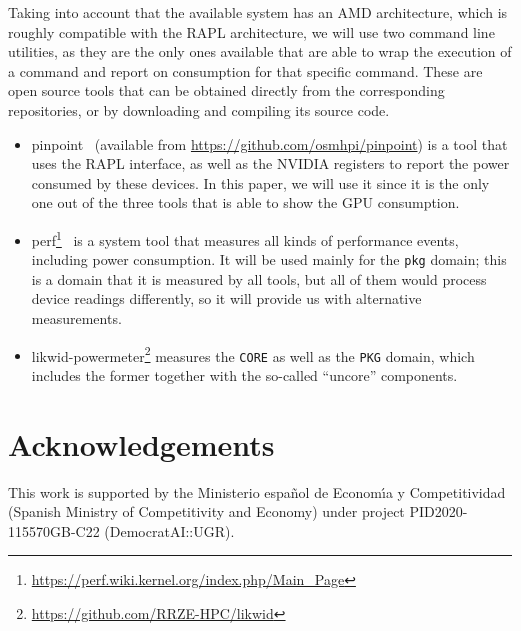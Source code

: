 \documentclass[a4paper,twoside]{article}
\begin{document}
Taking into account that the available system has an AMD architecture, which is
roughly compatible with the RAPL architecture, we will use two command line
utilities, as they are the only ones available that are able to wrap the execution of a command
and report on consumption for that specific command. These are open source tools
that can be obtained directly from the corresponding repositories, or by downloading and
compiling its source code. \begin{itemize}
\item {\sf pinpoint}~\cite{9307947} (available from
  \url{https://github.com/osmhpi/pinpoint}) is a tool that uses the RAPL
  interface, as well as the NVIDIA registers to report the power consumed by
  these devices. In this paper, we will use it since it is the only one out of
  the three tools that is able to show the GPU consumption.
\item {\sf
    perf}\footnote{\url{https://perf.wiki.kernel.org/index.php/Main_Page}}~\cite{treibig2010likwid} is a
  system tool that measures all kinds of performance events, including power
  consumption. It will be used mainly for the  \texttt{pkg} domain; this is a
  domain that it is measured by all tools, but all of them would process device
    readings differently, so it will provide us with alternative measurements. %
\item {\sf likwid-powermeter}\footnote{\url{https://github.com/RRZE-HPC/likwid}}
  measures the \texttt{CORE} as well as the \texttt{PKG} domain, which includes
  the former together with the so-called ``uncore'' components.
  
  \end{itemize}

\section*{Acknowledgements}

This work is supported by the Ministerio espa\~{n}ol de Econom\'{\i}a y
Competitividad (Spanish Ministry of Competitivity and Economy) under project
PID2020-115570GB-C22 (DemocratAI::UGR).



{\small
}
\end{document}
